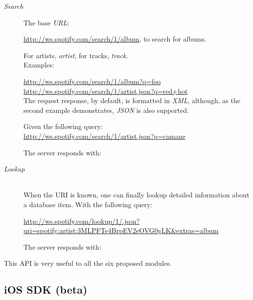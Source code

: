      \begin{description}
        \item[\emph{Search}] \hfill

          The base \emph{URL}:

          \url{http://ws.spotify.com/search/1/album}, to search for albums.

          For artists, \emph{artist}, for tracks, \emph{track}. \\

          Examples:

          \url{http://ws.spotify.com/search/1/album?q=foo} \\
          \url{http://ws.spotify.com/search/1/artist.json?q=red+hot} \\

          The request response, by default, is formatted in \emph{XML}, although, as the second example demonstrates, \emph{JSON} is also supported.

          Given the following query: \\
          \url{http://ws.spotify.com/search/1/artist.json?q=camane}

          The server responds with:

          

        \item[\emph{Lookup}] \hfill \\

          When the URI is known, one can finally lookup detailed information about a database item. With the following query:

          \url{http://ws.spotify.com/lookup/1/.json?uri=spotify:artist:3MLPFTe4BrpEV2eOVG0gLK&extras=album}

          The server responds with:

          

      \end{description}

      This API is very useful to all the six proposed modules.


    \subsection{iOS SDK (beta)} %
    \label{sub:ios_sdk}
    
